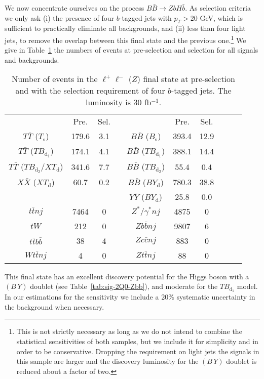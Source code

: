 \documentclass[12pt,a4paper]{article}
\newcommand{\TT}{T \bar T}
\newcommand{\BB}{B \bar B}
\newcommand{\XX}{X \bar X}
\newcommand{\YY}{Y \bar Y}
\newcommand{\Ts}{T_\text{s}}
\newcommand{\Bs}{B_\text{s}}
\newcommand{\TBd}{TB_{\text{d}_1}}
\newcommand{\TBD}{TB_{\text{d}_2}}
\newcommand{\XTd}{XT_\text{d}}
\newcommand{\BYd}{BY_\text{d}}
\newcommand{\BY}{(B \, Y)}
\begin{document}
We now concentrate ourselves on the process $\BB \to ZbH \bar b$. As selection criteria we only ask (i) the presence of four $b$-tagged jets with $p_T > 20$ GeV, which is sufficient to practically eliminate all backgrounds, and (ii) less than four light jets, to remove the overlap between this final state and the previous one.\footnote{This is not strictly necessary as long as we do not intend to combine the statistical sensitivities of both samples, but we include it for simplicity and in order to be conservative. Dropping the requirement on light jets the signals in this sample are larger and the discovery luminosity for the $(B \, Y)$ doublet is reduced about a factor of two.} We give in Table~\ref{tab:nsnb-2Q0-Zbb} the numbers of events at pre-selection and selection for all signals and backgrounds.
%
\begin{table}[t]
\begin{center}
\begin{tabular}{cccccccccc}
                 & Pre.  & Sel.   & \quad &          & Pre.  & Sel. \\[1mm]
$\TT$ ($\Ts$)    & 179.6 & 3.1  & & $\BB$ ($\Bs$)  & 393.4 & 12.9  \\
$\TT$ ($\TBd$)   & 174.1 & 4.1  & & $\BB$ ($\TBd$) & 388.1 & 14.4 \\
$\TT$ ($\TBD$/$\XTd$)   & 341.6 & 7.7  & & $\BB$ ($\TBD$) & 55.4 & 0.4 \\
$\XX$ ($\XTd$)   & 60.7  & 0.2  & & $\BB$ ($\BYd$) & 780.3 & 38.8 \\
                 &       &      & & $\YY$ ($\BYd$) & 25.8  & 0.0 \\
\hline
$t \bar t nj$    & 7464  & 0    & & $Z^*/\gamma^* nj$   & 4875 & 0 \\
$tW$             & 212   & 0    & & $Zb\bar b nj$  & 9807  & 6 \\
$t\bar tb\bar b$ & 38    & 4    & & $Zc \bar c nj$ & 883   & 0 \\
$Wt \bar t nj$   & 4     & 0    & & $Zt \bar t nj$ & 88    & 0 
\end{tabular}
\end{center}
\caption{Number of events in the $\ell^+ \ell^-$ ($Z$) final state at pre-selection and with the selection requirement of four $b$-tagged jets. The luminosity is 30 fb$^{-1}$.}
\label{tab:nsnb-2Q0-Zbb}
\end{table}
%
This final state has an excellent discovery potential for the Higgs boson with a 
$\BY$ doublet (see Table~\ref{tab:sig-2Q0-Zbb}), and moderate for the $\TBd$ model. In our estimations for the sensitivity we include a 20\% systematic uncertainty in the background when necessary.
\end{document}
